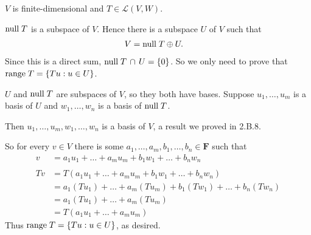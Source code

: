\documentclass[a5paper]{article}
\begin{document}
\newcommand    \C          {\mathbf{C}}
\newcommand    \R          {\mathbf{R}}
\renewcommand  \L          {\mathcal{L}}
\newcommand    \F          {\mathbf{F}}
\renewcommand  \P          {\mathcal{P}}
\newcommand    \nullspace  {\text{null\;}}
\newcommand    \range      {\text{range\;}}
\newcommand    \linspan    {\text{span\;}}

    $V$ is finite-dimensional and $T \in \L(V,W)$.

    $\nullspace T$ is a subspace of $V$.
    Hence there is a subspace $U$ of $V$ such that
\begin{align*}
        V &= \nullspace T \oplus U .
\end{align*}
    Since this is a direct sum, $\nullspace T \,\cap\, U = \{0\}$.
    So we only need to prove that $\range T = \{ Tu : u \in U \}$.

    $U$ and $\nullspace T$ are subspaces of $V$, so they both have bases.
    Suppose $u_1,\dots,u_m$ is a basis of $U$ and $w_1,\dots,w_n$ is a basis of $\nullspace T$.

    Then $u_1,\dots,u_m,w_1,\dots,w_n$ is a basis of $V$, a result we proved in 2.B.8.

    So for every $v \in V$ there is some $a_1,\dots,a_m,b_1,\dots,b_n \in \F$ such that
\begin{align*}
         v &= a_1u_1 + \dots + a_mu_m + b_1w_1 + \dots + b_nw_n                 \\
                                                                                \\
        Tv &= T(a_1u_1 + \dots + a_mu_m + b_1w_1 + \dots + b_nw_n)              \\
           &= a_1(Tu_1) + \dots + a_m(Tu_m) + b_1(Tw_1) + \dots + b_n(Tw_n)     \\
           &= a_1(Tu_1) + \dots + a_m(Tu_m)                                     \\
           &= T(a_1u_1 + \dots + a_mu_m)
\end{align*}
    Thus $\range T = \{ Tu : u \in U \}$, as desired.
\end{document}
